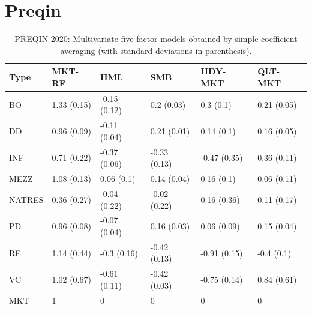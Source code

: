 
\clearpage


\section{Preqin}


\begin{table}[ht]
	\centering
	\begin{tabular}{l@{\hskip 0.3in}l@{\hskip 0.2in}l@{\hskip 0.2in}l@{\hskip 0.2in}l@{\hskip 0.2in}l@{\hskip 0.1in}}
		Type & MKT-RF & HML & SMB & HDY-MKT & QLT-MKT \\ 
		\hline
		\hline
		BO & 1.33 (0.15) & -0.15 (0.12) & 0.2 (0.03) & 0.3 (0.1) & 0.21 (0.05) \\ 
		DD & 0.96 (0.09) & -0.11 (0.04) & 0.21 (0.01) & 0.14 (0.1) & 0.16 (0.05) \\ 
		INF & 0.71 (0.22) & -0.37 (0.06) & -0.33 (0.13) & -0.47 (0.35) & 0.36 (0.11) \\ 
		MEZZ & 1.08 (0.13) & 0.06 (0.1) & 0.14 (0.04) & 0.16 (0.1) & 0.06 (0.11) \\ 
		NATRES & 0.36 (0.27) & -0.04 (0.22) & -0.02 (0.22) & 0.16 (0.36) & 0.11 (0.17) \\ 
		PD & 0.96 (0.08) & -0.07 (0.04) & 0.16 (0.03) & 0.06 (0.09) & 0.15 (0.04) \\ 
		RE & 1.14 (0.44) & -0.3 (0.16) & -0.42 (0.13) & -0.91 (0.15) & -0.4 (0.1) \\ 
		VC & 1.02 (0.67) & -0.61 (0.11) & -0.42 (0.03) & -0.75 (0.14) & 0.84 (0.61) \\ 
		\hline
		MKT & 1 & 0 & 0 & 0 & 0 \\ 
		\hline
		\hline
	\end{tabular}
	\caption{
		PREQIN 2020: Multivariate five-factor models obtained by simple coefficient averaging (with standard deviations in parenthesis).
	} 
	\label{tab:average_coefs_preqin_2020}
\end{table}


